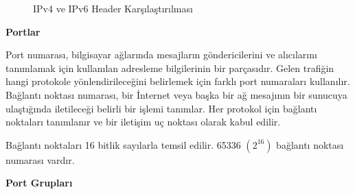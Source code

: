 \begin{figure}[!htb]
    \centering
    \qquad
    \caption{IPv4 ve IPv6 Header Karşılaştırılması}%
    \label{fig:example}
\end{figure}



\newpage

\vspace{10mm}
\textbf{Portlar}
\vspace{5mm}

Port numarası, bilgisayar ağlarında mesajların göndericilerini ve alıcılarını tanımlamak için kullanılan adresleme bilgilerinin bir parçasıdır. Gelen trafiğin hangi protokole yönlendirileceğini belirlemek için farklı port numaraları kullanılır. Bağlantı noktası numarası, bir İnternet veya başka bir ağ mesajının bir sunucuya ulaştığında iletileceği belirli bir işlemi tanımlar. Her protokol için bağlantı noktaları tanımlanır ve bir iletişim uç noktası olarak kabul edilir.

Bağlantı noktaları 16 bitlik sayılarla temsil edilir. 65336  $(2^{16})$ bağlantı noktası numarası vardır.

\vspace{10mm}
\textbf{Port Grupları}
\vspace{5mm}


